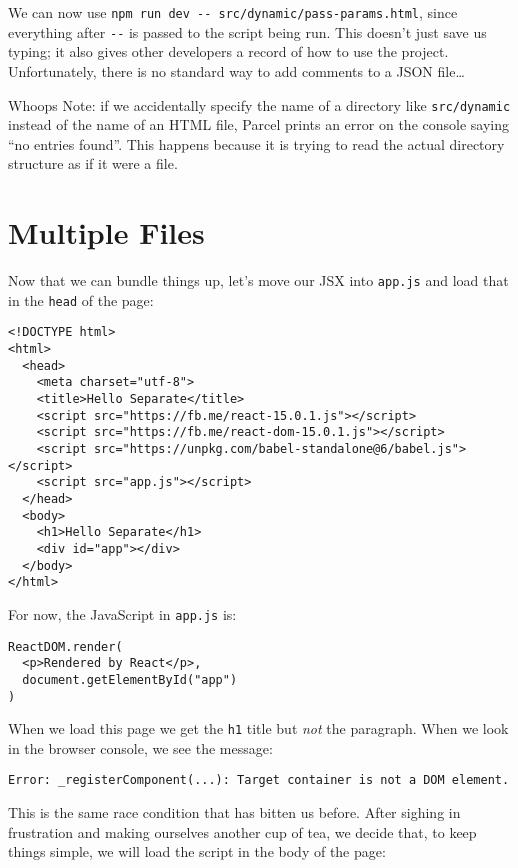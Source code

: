 We can now use \texttt{npm\ run\ dev\ -\/-\ src/dynamic/pass-params.html},
since everything after \texttt{-\/-} is passed to the script being run.
This doesn't just save us typing;
it also gives other developers a record of how to use the project.
Unfortunately,
there is no standard way to add comments to a JSON file\ldots{}

\begin{aside}{Whoops}
  Note:
  if we accidentally specify the name of a directory like \texttt{src/dynamic}
  instead of the name of an HTML file,
  Parcel prints an error on the console saying ``no entries found''.
  This happens because it is trying to read the actual directory structure
  as if it were a file.
\end{aside}

\section{Multiple Files}\label{s:dynamic-multiple}

Now that we can bundle things up,
let's move our JSX into \texttt{app.js} and load that in the \texttt{head} of the page:

\begin{verbatim}
<!DOCTYPE html>
<html>
  <head>
    <meta charset="utf-8">
    <title>Hello Separate</title>
    <script src="https://fb.me/react-15.0.1.js"></script>
    <script src="https://fb.me/react-dom-15.0.1.js"></script>
    <script src="https://unpkg.com/babel-standalone@6/babel.js"></script>
    <script src="app.js"></script>
  </head>
  <body>
    <h1>Hello Separate</h1>
    <div id="app"></div>
  </body>
</html>
\end{verbatim}

For now,
the JavaScript in \texttt{app.js} is:

\begin{verbatim}
ReactDOM.render(
  <p>Rendered by React</p>,
  document.getElementById("app")
)
\end{verbatim}

When we load this page we get the \texttt{h1} title but \emph{not} the paragraph.
When we look in the browser console,
we see the message:

\begin{verbatim}
Error: _registerComponent(...): Target container is not a DOM element.
\end{verbatim}

This is the same race condition that has bitten us before.
After sighing in frustration and making ourselves another cup of tea,
we decide that,
to keep things simple,
we will load the script in the body of the page:

